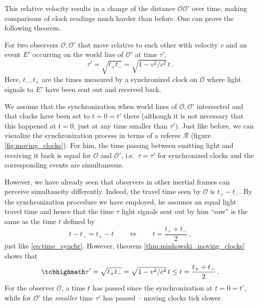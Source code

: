 This relative velocity results in a change of the distance $\overline{\mathcal{O} \mathcal{O}'}$ over time, making comparisons of clock readings much harder than before. One can prove the following theorem.
\begin{thm}\label{thm:minkowski_moving_clocks}
	For two observers $\mathcal{O}, \mathcal{O}'$ that move relative to each other with velocity $v$ and an event $E'$ occurring on the world line of $\mathcal{O}'$ at time $\tau'$,
	\begin{equation}
		\tau' = \sqrt{t_+ t_-} = \sqrt{1 - v^2 / c^2} \, t \, .
	\end{equation}
	Here, $t_-, t_+$ are the times measured by a synchronized clock on $\mathcal{O}$ where light signals to $E'$ have been sent out and received back.
\end{thm}
We assume that the synchronization when world lines of $\mathcal{O}, \mathcal{O}'$ intersected and that clocks have been set to $t = 0 = t'$ there (although it is not necessary that this happened at $t = 0$, just at any time smaller than $\tau'$). Just like before, we can visualize the synchronization process in terms of a referee $\mathcal{R}$ (figure \ref{fig:moving_clocks}). For him, the time passing between emitting light and receiving it back is equal for $\mathcal{O}$ and $\mathcal{O}'$, i.e.~$\tau = \tau'$ for synchronized clocks and the corresponding events are simultaneous.

However, we have already seen that observers in other inertial frames can perceive simultaneity differently. Indeed, the travel time seen by $\mathcal{O}$ is $t_+ - t_-$. By the synchronization procedure we have employed, he assumes an equal light travel time and hence that the time $\tau$ light signals sent out by him \enquote{saw} is the same as the time $t$ defined by
\begin{equation*}
	t - t_- = t_+ - t
	\qquad \Leftrightarrow \qquad
	t = \frac{t_+ + t_-}{2}
	\, ,
\end{equation*}
just like \eqref{eq:time_synchr}. However, theorem \ref{thm:minkowski_moving_clocks} shows that
\begin{equation}
	\eqbox{
	\tau' = \sqrt{t_+ t_-} = \sqrt{1 - v^2 / c^2} \, t \leq t = \frac{t_+ + t_-}{2}
	} \, .
\end{equation}
For the observer $\mathcal{O}$, a time $t$ has passed since the synchronization at $t = 0 = t'$, while for $\mathcal{O}'$ the \emph{smaller} time $\tau'$ has passed -- moving clocks tick slower.



